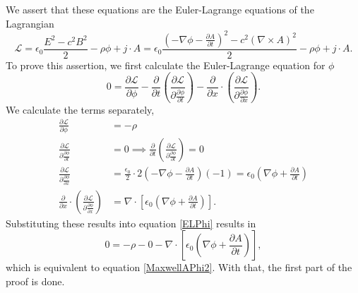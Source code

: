 \documentclass[prb,preprint]{revtex4-1}
\begin{document}
We assert that these equations are the Euler-Lagrange equations of the Lagrangian
\begin{equation}
\mathcal{L} = \epsilon_0 \frac{E^2 - c^2 B^2}{2} - \rho\phi + j \cdot A
= \epsilon_0 \frac{(-\nabla\phi - \frac{\partial A}{\partial t})^2 - c^2 (\nabla \times A)^2}{2} - \rho\phi + j \cdot A.
\end{equation}
To prove this assertion, we first calculate the Euler-Lagrange equation for $\phi$
\begin{equation} \label{ELPhi}
0 = \frac{\partial \mathcal{L}}{\partial \phi}
-\frac{\partial}{\partial t} \left( \frac{\partial \mathcal{L}}{\partial \frac{\partial \phi}{\partial t}} \right) 
-\frac{\partial}{\partial x} \cdot \left( \frac{\partial \mathcal{L}}{\partial \frac{\partial \phi}{\partial x}} \right).
\end{equation}
We calculate the terms separately,
\begin{align}
\frac{\partial \mathcal{L}}{\partial \phi} &= -\rho \\
\frac{\partial \mathcal{L}}{\partial \frac{\partial \phi}{\partial t}} &= 0
\implies \frac{\partial}{\partial t} \left( \frac{\partial \mathcal{L}}{\partial \frac{\partial \phi}{\partial t}}\right) = 0 \\
\frac{\partial \mathcal{L}}{\partial \frac{\partial \phi}{\partial x}}
&= \frac{\epsilon_0}{2} \cdot 2 \left(-\nabla \phi - \frac{\partial A}{\partial t} \right) (-1)
= \epsilon_0 \left(\nabla \phi + \frac{\partial A}{\partial t} \right) \\
\frac{\partial}{\partial x} \cdot \left(\frac{\partial \mathcal{L}}{\partial \frac{\partial \phi}{\partial x}} \right)
&= \nabla \cdot \left[\epsilon_0 \left(\nabla \phi + \frac{\partial A}{\partial t} \right)\right].
\end{align}
Substituting these results into equation \eqref{ELPhi} results in
\begin{equation}
0 = -\rho - 0 -\nabla \cdot \left[\epsilon_0 \left(\nabla \phi + \frac{\partial A}{\partial t} \right)\right],
\end{equation}
which is equivalent to equation \eqref{MaxwellAPhi2}.
With that, the first part of the proof is done.
\end{document}
